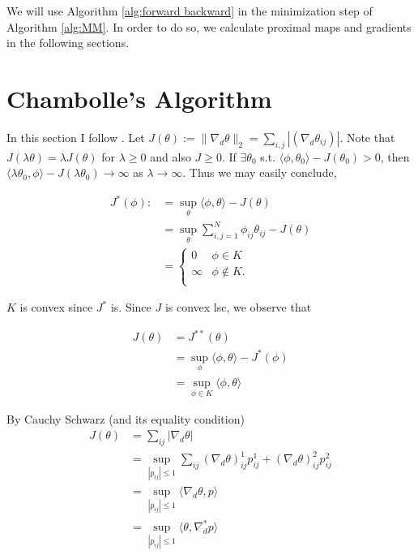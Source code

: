 \documentclass[paper=a4, fontsize=11pt]{scrartcl} %
\numberwithin{equation}{section} %
\numberwithin{figure}{section} %
\numberwithin{table}{section} %
\newcommand{\param}{\theta}
\newcommand{\paramm}{\phi}
\newcommand{\grad}{\nabla_{d} }
\begin{document}
We will use Algorithm \ref{alg:forward backward} in the minimization
step of Algorithm \ref{alg:MM}. In order to do so, we calculate
proximal maps and gradients in the following sections.

\section{Chambolle's Algorithm}
In this section I follow \cite{chambolle2004algorithm}. Let $J(\param) :=
\|\grad \param \|_2 = \sum_{i,j} |(\grad \param_{ij})|$.  Note that $J(\lambda
\param) = \lambda J(\param)$ for $\lambda \geq 0$ and also $J \geq 0$. If
$\exists \param_0$ s.t.  $\langle \paramm, \param_0 \rangle - J(\param_0) > 0$, then
$\langle \lambda \param_0, \paramm \rangle - J(\lambda \param_0) \to \infty$ as
$\lambda \to \infty$. Thus we may easily conclude,

\begin{align*}
  J^{*}(\paramm) :&= \sup_{\param} \langle \paramm, \param \rangle - J(\param) \\
  &= \sup_{\param} \sum_{i,j = 1}^{N} \paramm_{ij} \param_{ij} - J( \param ) \\ 
  &= 
  \begin{cases}
    0 & \paramm \in K\\
    \infty & \paramm \not \in K.\\ 
  \end{cases}
\end{align*}
 
$K$ is convex since $J^{*}$ is. Since $J$ is convex lsc, we observe
that

\begin{align*}
  J(\param) &= J^{**}(\param) \\ 
  &= \sup_{\paramm} \langle \paramm, \param \rangle - J^{*}(\paramm) \\
  &= \sup_{\paramm\in K} \langle \paramm, \param \rangle
\end{align*}

By Cauchy Schwarz (and its equality condition)   
\begin{align*}
  J(\param) &= \sum_{ij} | \grad \param | \\ 
  &= \sup_{|p_{ij}| \leq 1} \sum_{ij} (\grad \param)^1_{ij} p^{1}_{ij} + (\grad \param)^2_{ij} p^{2}_{ij} \\
  &= \sup_{|p_{ij}| \leq 1} \langle \grad \param, p  \rangle \\
  &= \sup_{|p_{ij}| \leq 1} \langle \param, \grad^{*} p  \rangle \\
\end{align*}
\end{document}
